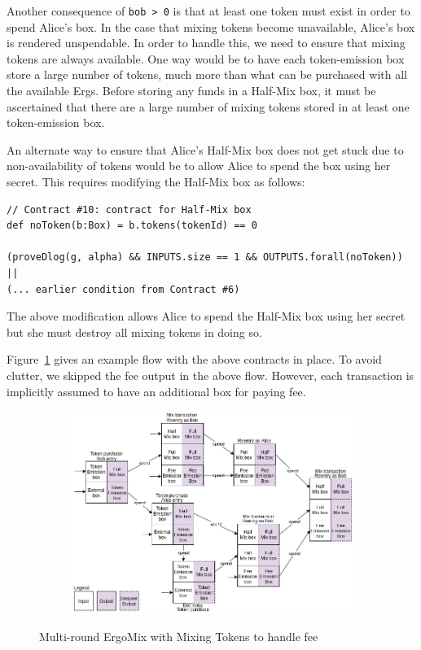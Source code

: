 \documentclass[runningheads]{llncs}
\newcommand{\mixname}{ErgoMix\xspace}
\begin{document}
Another consequence of \texttt{bob > 0} is that at least one token must exist in order to spend Alice's box. In the case that mixing tokens become unavailable, Alice's box is rendered unspendable. In order to handle this, we need to ensure that mixing tokens are always available. One way would be to have each token-emission box store a large number of tokens, much more than what can be purchased with all the available Ergs. Before storing any funds in a Half-Mix box, it must be ascertained that there are a large number of mixing tokens stored in at least one token-emission box. 

An alternate way to ensure that Alice's Half-Mix box does not get stuck due to non-availability of tokens would be to allow Alice to spend the box using her secret. This requires modifying the Half-Mix box as follows:

{\small
\begin{Verbatim}[frame=single]
// Contract #10: contract for Half-Mix box
def noToken(b:Box) = b.tokens(tokenId) == 0

(proveDlog(g, alpha) && INPUTS.size == 1 && OUTPUTS.forall(noToken)) || 
(... earlier condition from Contract #6)
\end{Verbatim}
}

The above modification allows Alice to spend the Half-Mix box using her secret but she must destroy all mixing tokens in doing so. 

Figure~\ref{fig:mixingtokens} gives an example flow with the above contracts in place. To avoid clutter, we skipped the fee output in the above flow. However, each transaction is implicitly assumed to have an additional box for paying fee.

\begin{figure}[h]
	\centering
	\begin{subfigure}{0.9\textwidth}
		\centering
		\includegraphics[width=\linewidth]{MixingTokens.jpg}
	\end{subfigure}
	\caption{Multi-round \mixname with Mixing Tokens to handle fee}
\label{fig:mixingtokens}
\end{figure}
\end{document}
